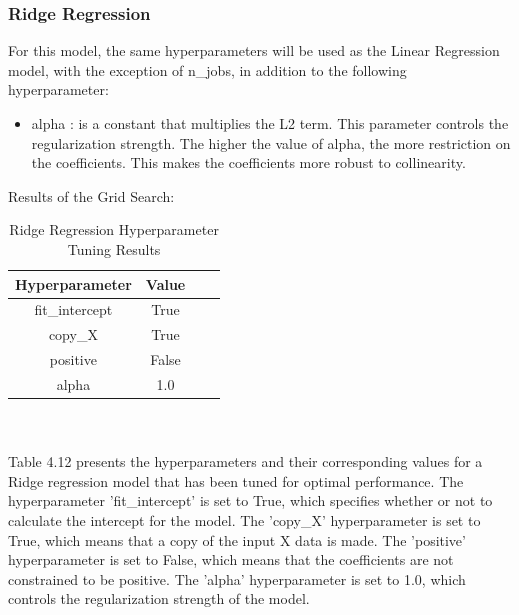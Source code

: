 \documentclass{report}
\begin{document}
\subsubsection{Ridge Regression}
For this model, the same hyperparameters will be used as the Linear Regression model, with the exception of n\_jobs, in addition to the following hyperparameter:
\begin{itemize}
    \item alpha : is a constant that multiplies the L2 term. This parameter controls the regularization strength. The higher the value of alpha, the more restriction on the coefficients. This makes the coefficients more robust to collinearity\cite{scikit-learn}. 
\end{itemize} \newpage
Results of the Grid Search:
\begin{table}[h]
\centering
\begin{tabular}{|c|c|c|c|}
\hline
\textbf{Hyperparameter} & \textbf{Value} \\ \hline
fit\_intercept & True \\ \hline
copy\_X & True \\ \hline
positive & False \\ \hline
alpha & 1.0 \\ \hline
\end{tabular}
\caption{Ridge Regression Hyperparameter Tuning Results}
\end{table}\\
\\
Table 4.12 presents the hyperparameters and their corresponding values for a Ridge regression model that has been tuned for optimal performance. The hyperparameter 'fit\_intercept' is set to True, which specifies whether or not to calculate the intercept for the model. The 'copy\_X' hyperparameter is set to True, which means that a copy of the input X data is made. The 'positive' hyperparameter is set to False, which means that the coefficients are not constrained to be positive. The 'alpha' hyperparameter is set to 1.0, which controls the regularization strength of the model. 
\end{document}
